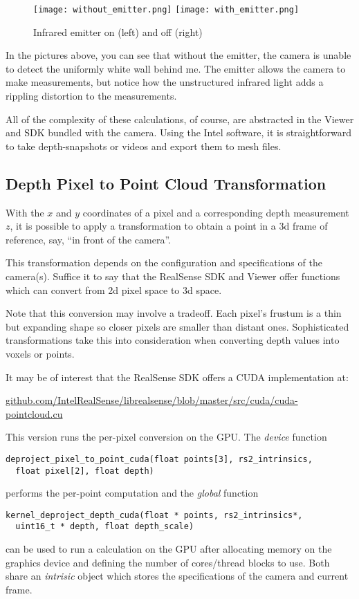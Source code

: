 \begin{figure}[h]
\centering
\texttt{[image: without\_emitter.png]}
\texttt{[image: with\_emitter.png]}
\caption{Infrared emitter on (left) and off (right)}
\end{figure}

In the pictures above, you can see that without the emitter, the camera is
unable to detect the uniformly white wall behind me. The emitter allows the camera
to make measurements, but notice how the unstructured infrared light adds a rippling
distortion to the measurements.

All of the complexity of these calculations, of course, are abstracted in the Viewer
and SDK bundled with the camera.
Using the Intel software, it is straightforward to take depth-snapshots or videos
and export them to mesh files.

\subsection{Depth Pixel to Point Cloud Transformation}
With the $x$ and $y$ coordinates of a pixel and a corresponding depth measurement $z$,
it is possible to apply a transformation to obtain a point in a 3d frame of
reference, say, ``in front of the camera''.

This transformation depends on the configuration and specifications of the camera(s).
Suffice it to say that the RealSense SDK and Viewer offer functions which can
convert from 2d pixel space to 3d space.

Note that this conversion may involve a tradeoff. Each pixel's frustum is a thin but expanding shape so closer pixels are smaller than distant ones. Sophisticated transformations take this into consideration when converting depth values into voxels or points.

It may be of interest that the RealSense SDK offers a CUDA implementation at:

\url{github.com/IntelRealSense/librealsense/blob/master/src/cuda/cuda-pointcloud.cu}

This version runs the per-pixel conversion on the GPU. The \textit{device} function
\begin{lstlisting}
deproject_pixel_to_point_cuda(float points[3], rs2_intrinsics,
  float pixel[2], float depth)
\end{lstlisting}
performs the per-point computation and the \textit{global} function
\begin{lstlisting}
kernel_deproject_depth_cuda(float * points, rs2_intrinsics*,
  uint16_t * depth, float depth_scale)
\end{lstlisting}
can be used to run a calculation on the GPU after allocating memory on the graphics device and
defining the number of cores/thread blocks to use. Both share an \textit{intrisic} object which stores the specifications of the camera and current frame.

